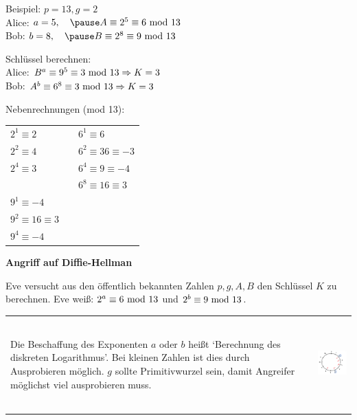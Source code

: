 \begin{frame}[fragile]

Beispiel: $p=13, g=2$ \\ \pause
Alice: $a=5, \quad \pause A \equiv 2^5 \equiv 6 \tmod 13$ \\
Bob: $b=8, \quad \pause B \equiv 2^8 \equiv 9 \tmod 13$ \pause

Schlüssel berechnen: \\ \pause
Alice: $B^a \equiv 9^5 \equiv 3 \text{ mod } 13 \Rightarrow K = 3$ \\ \pause
Bob: $A^b \equiv 6^8 \equiv 3 \text{ mod } 13 \Rightarrow K = 3$ \pause

\footnotesize
Nebenrechnungen (mod 13): \\
\begin{tabular}{l l l}
$2^1 \equiv 2$    &  \quad &  $6^1 \equiv 6$  \\
$2^2 \equiv 4$    &    &  $6^2 \equiv 36 \equiv -3$ \\
$2^4 \equiv 3$    &   &  $6^4 \equiv 9 \equiv -4$ \\
& & $6^8 \equiv 16 \equiv 3$  \\
$9^1 \equiv -4$ \\
$9^2 \equiv 16 \equiv 3$\\
$9^4 \equiv -4 $
\end{tabular}
\end{frame}


\begin{frame}[fragile]

\textbf{Angriff auf Diffie-Hellman} \pause

Eve versucht aus den öffentlich bekannten Zahlen $p,g,A,B$ den Schlüssel $K$ zu berechnen. \pause
Eve weiß: $2^a \equiv 6 \text{ mod } 13$ und $2^b \equiv 9 \text{ mod } 13$. \pause

\begin{tabular}{ll}
\begin{minipage}[b]{8cm}
Die Beschaffung des Exponenten $a$ oder $b$ heißt `Berechnung des diskreten Logarithmus'. \pause Bei kleinen
Zahlen ist dies durch Ausprobieren möglich.  $g$ sollte Primitivwurzel sein, damit Angreifer möglichst viel ausprobieren muss.  
\end{minipage} &
\includegraphics[height=3.5cm]{bild2.png}
\end{tabular}
\end{frame}

